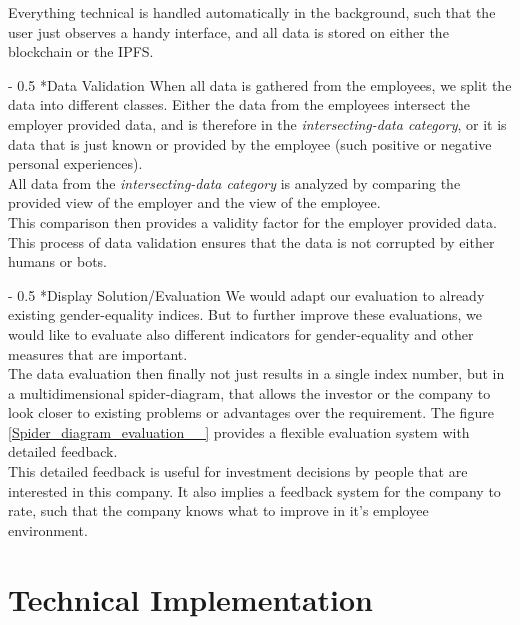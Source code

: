 \documentclass[portrait,a4paper]{article}
\makeatletter
\renewcommand\paragraph{\@startsection{paragraph}{4}{0mm}%
	{-\baselineskip}%
	{0.5\baselineskip}%
	{\normalfont\bfseries}%
}%
\makeatother
\begin{document}
			Everything technical is handled automatically in the background, such that the 
			user just observes a handy interface, and all data is stored on either the blockchain or the IPFS.

		\paragraph*{Data Validation}
			When all data is gathered from the employees, we split the data into different classes. 
			Either the data from the employees intersect the employer provided data, and is therefore 
			in the \textit{intersecting-data category}, or it is data that is just known or 
			provided by the employee (such positive or negative personal experiences).\\

			All data from the \textit{intersecting-data category} is analyzed by comparing the 
			provided view of the employer and the view of the employee.\\
			This comparison then provides a validity factor for the employer provided data.\\
			This process of data validation ensures that the data is not corrupted by either humans or bots.

		\paragraph*{Display Solution/Evaluation}
			We would adapt our evaluation to already existing gender-equality indices. 
			But to further improve these evaluations, we would like to evaluate also different indicators 
			for gender-equality and other measures that are important.\\
			The data evaluation then finally not just results in a single index number, but in a multidimensional 
			spider-diagram, that allows the investor or the company to look closer to existing problems or 
			advantages over the requirement.
			The figure \ref{Spider_diagram_evaluation__} provides a flexible evaluation system with detailed feedback.\\
			This detailed feedback is useful for investment decisions 
			by people that are interested in this company. It also implies a feedback system for the 
			company to rate, such that the company knows what to improve in it's employee environment.	
	
			
\section{Technical Implementation}
	
\end{document}
